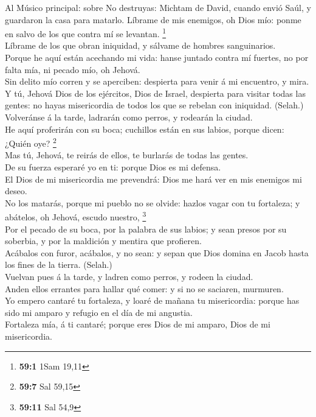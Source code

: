  Al Músico principal: sobre No destruyas: Michtam de David,
cuando envió Saúl, y guardaron la casa para matarlo. Líbrame de mis
enemigos, oh Dios mío: ponme en salvo de los que contra mí se levantan.
\footnote{\textbf{59:1} 1Sam 19,11}\\
 Líbrame de los que obran iniquidad, y sálvame de hombres
sanguinarios.\\
 Porque he aquí están acechando mi vida: hanse juntado
contra mí fuertes, no por falta mía, ni pecado mío, oh Jehová.\\
 Sin delito mío corren y se aperciben: despierta para venir
á mi encuentro, y mira.\\
 Y tú, Jehová Dios de los ejércitos, Dios de Israel,
despierta para visitar todas las gentes: no hayas misericordia de todos
los que se rebelan con iniquidad. (Selah.)\\
 Volveránse á la tarde, ladrarán como perros, y rodearán la
ciudad.\\
 He aquí proferirán con su boca; cuchillos están en sus
labios, porque dicen: ¿Quién oye? \footnote{\textbf{59:7} Sal 59,15}\\
 Mas tú, Jehová, te reirás de ellos, te burlarás de todas
las gentes.\\
 De su fuerza esperaré yo en ti: porque Dios es mi
defensa.\\
 El Dios de mi misericordia me prevendrá: Dios me hará ver
en mis enemigos mi deseo.\\
 No los matarás, porque mi pueblo no se olvide: hazlos
vagar con tu fortaleza; y abátelos, oh Jehová, escudo nuestro,
\footnote{\textbf{59:11} Sal 54,9}\\
 Por el pecado de su boca, por la palabra de sus labios; y
sean presos por su soberbia, y por la maldición y mentira que
profieren.\\
 Acábalos con furor, acábalos, y no sean: y sepan que Dios
domina en Jacob hasta los fines de la tierra. (Selah.)\\
 Vuelvan pues á la tarde, y ladren como perros, y rodeen la
ciudad.\\
 Anden ellos errantes para hallar qué comer: y si no se
saciaren, murmuren.\\
 Yo empero cantaré tu fortaleza, y loaré de mañana tu
misericordia: porque has sido mi amparo y refugio en el día de mi
angustia.\\
 Fortaleza mía, á ti cantaré; porque eres Dios de mi
amparo, Dios de mi misericordia.


